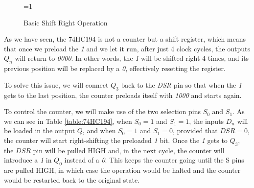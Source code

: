 \begin{figure}[H]
    \centering
 
    \ifnum\value{ANIMATION}=1 {
    } 
    \fi
    
    \caption{Basic Shift Right Operation}
    \label{fig:74HC194_SHIFT_RIGHT}
\end{figure}

As we have seen, the 74HC194 is not a counter but a shift register, which means that once we preload the \textit{1} and we let it run, after just 4 clock cycles, the outputs $Q_n$ will return to \textit{0000}. In other words, the \textit{1} will be shifted right 4 times, and its previous position will be replaced by a \textit{0}, effectively resetting the register.\medskip

To solve this issue, we will connect $Q_3$ back to the \textit{DSR} pin so that when the \textit{1} gets to the last position, the counter preloads itself with \textit{1000} and starts again.\medskip

To control the counter, we will make use of the two selection pins $S_0$ and $S_1$. As we can see in Table \ref{table:74HC194}, when $S_0 = 1$ and $S_1 = 1$, the inputs $D_n$ will be loaded in the output $Q$, and when $S_0 = 1$ and $S_1 = 0$, provided that $DSR = 0$, the counter will start right-shifting the preloaded \textit{1} bit. Once the \textit{1} gets to $Q_3$, the $DSR$ pin will be pulled HIGH and, in the next cycle, the counter will introduce a \textit{1} in $Q_0$ instead of a \textit{0}. This keeps the counter going until the S pins are pulled HIGH, in which case the operation would be halted and the counter would be restarted back to the original state.\medskip

